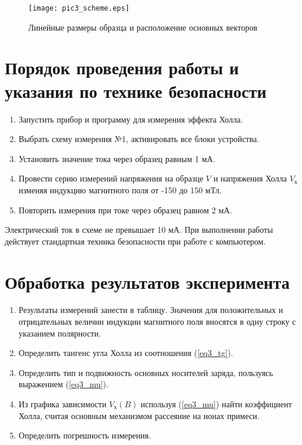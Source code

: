 \begin{figure}[h!]\centering
\texttt{[image: pic3\_scheme.eps]}
\caption{Линейные размеры образца и расположение основных векторов}
\label{pic3_scheme}
\end{figure}

\section{Порядок проведения работы и указания по технике безопасности}

\begin{enumerate}
\item Запустить прибор и программу для измерения эффекта Холла.
\item Выбрать схему измерения №1, активировать все блоки устройства.
\item Установить значение тока через образец равным 1 мА.
\item Провести серию измерений напряжения на образце $V$ и напряжения Холла $V_{\text{х}}$ изменяя индукцию магнитного поля от -150 до 150 мТл.
\item Повторить измерения при токе через образец равном 2 мА.
\end{enumerate}

Электрический ток в схеме не превышает 10 мА. При выполнении работы действует стандартная техника безопасности при работе с компьютером.

\section{Обработка результатов эксперимента}

\begin{enumerate}
\item Результаты измерений занести в таблицу. Значения для положительных и отрицательных величин индукции магнитного поля вносятся в одну строку с указанием полярности.
\item Определить тангенс угла Холла из соотношения (\ref{eq3_tg}).
\item Определить тип и подвижность основных носителей заряда, пользуясь выражением (\ref{eq3_mu}).
\item Из графика зависимости $V_{\text{х}} (B)$ используя (\ref{eq3_mu}) найти коэффициент Холла, считая основным механизмом рассеяние на ионах примеси.
\item Определить погрешность измерения.
\end{enumerate}

